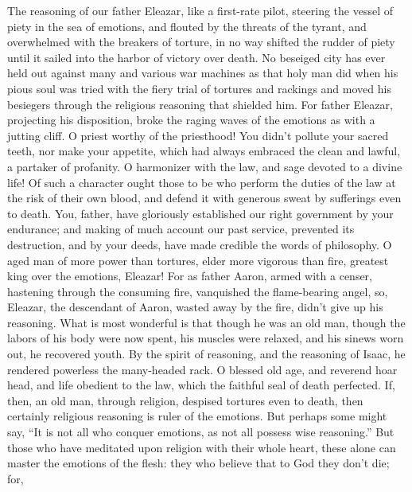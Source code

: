  The reasoning of our father Eleazar, like a first-rate
pilot, steering the vessel of piety in the sea of emotions, 
and flouted by the threats of the tyrant, and overwhelmed with the
breakers of torture,  in no way shifted the rudder of piety
until it sailed into the harbor of victory over death.  No
beseiged city has ever held out against many and various war machines as
that holy man did when his pious soul was tried with the fiery trial of
tortures and rackings and moved his besiegers through the religious
reasoning that shielded him.  For father Eleazar, projecting
his disposition, broke the raging waves of the emotions as with a
jutting cliff.  O priest worthy of the priesthood! You
didn't pollute your sacred teeth, nor make your appetite, which had
always embraced the clean and lawful, a partaker of profanity.
 O harmonizer with the law, and sage devoted to a divine
life!  Of such a character ought those to be who perform the
duties of the law at the risk of their own blood, and defend it with
generous sweat by sufferings even to death.  You, father,
have gloriously established our right government by your endurance; and
making of much account our past service, prevented its destruction, and
by your deeds, have made credible the words of philosophy. 
O aged man of more power than tortures, elder more vigorous than fire,
greatest king over the emotions, Eleazar!  For as father
Aaron, armed with a censer, hastening through the consuming fire,
vanquished the flame-bearing angel,  so, Eleazar, the
descendant of Aaron, wasted away by the fire, didn't give up his
reasoning.  What is most wonderful is that though he was an
old man, though the labors of his body were now spent, his muscles were
relaxed, and his sinews worn out, he recovered youth.  By
the spirit of reasoning, and the reasoning of Isaac, he rendered
powerless the many-headed rack.  O blessed old age, and
reverend hoar head, and life obedient to the law, which the faithful
seal of death perfected.  If, then, an old man, through
religion, despised tortures even to death, then certainly religious
reasoning is ruler of the emotions.  But perhaps some might
say, ``It is not all who conquer emotions, as not all possess wise
reasoning.''  But those who have meditated upon religion
with their whole heart, these alone can master the emotions of the
flesh:  they who believe that to God they don't die; for,

